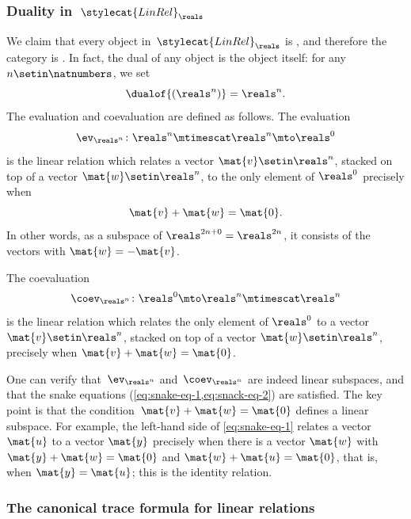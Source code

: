 \subsubsection{Duality in~$\stylecat{LinRel}_\reals$}

We claim that every object in~$\stylecat{LinRel}_\reals$ is , and therefore the category is .
In fact, the dual of any object is the object itself: for any $n \setin \natnumbers$, we set
\begin{equation}
    \dualof{(\reals^n)} = \reals^n.
\end{equation}
The evaluation and coevaluation are defined as follows.
The evaluation
\begin{equation}
    \ev_{\reals^n} \colon \reals^n \mtimescat \reals^n \mto \reals^0
\end{equation}
is the linear relation which relates a vector $\mat{v} \setin \reals^n$, stacked on top of a vector $\mat{w} \setin \reals^n$, to the only element of $\reals^0$ precisely when
\begin{equation}
    \mat{v} + \mat{w} = \mat{0}.
\end{equation}
In other words, as a subspace of $\reals^{2n+0} = \reals^{2n}$, it consists of the vectors with $\mat{w} = -\mat{v}$.

The coevaluation
\begin{equation}
    \coev_{\reals^n} \colon \reals^0 \mto \reals^n \mtimescat \reals^n
\end{equation}
is the linear relation which relates the only element of $\reals^0$ to a vector $\mat{v} \setin \reals^n$, stacked on top of a vector $\mat{w} \setin \reals^n$, precisely when $\mat{v} + \mat{w} = \mat{0}$.

\begin{remark}
    One can verify that~$\ev_{\reals^n}$ and~$\coev_{\reals^n}$ are indeed linear subspaces, and that the snake equations (\cref{eq:snake-eq-1,eq:snack-eq-2}) are satisfied.
    The key point is that the condition~$\mat{v} + \mat{w} = \mat{0}$ defines a linear subspace.
    For example, the left-hand side of \cref{eq:snake-eq-1} relates a vector $\mat{u}$ to a vector $\mat{y}$ precisely when there is a vector $\mat{w}$ with $\mat{y} + \mat{w} = \mat{0}$ and $\mat{w} + \mat{u} = \mat{0}$, that is, when $\mat{y} = \mat{u}$; this is the identity relation.
\end{remark}

\subsubsection{The canonical trace formula for linear relations}

